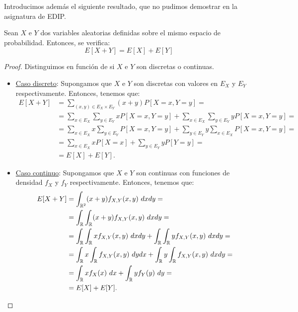 Introducimos además el siguiente resultado, que no pudimos demostrar en la asignatura de EDIP.
\begin{prop}
    Sean $X$ e $Y$ dos variables aleatorias definidas sobre el mismo espacio de probabilidad. Entonces, se verifica:
    \begin{equation*}
        E[X+Y] = E[X]+E[Y]
    \end{equation*}
\end{prop}
\begin{proof}
    Distinguimos en función de si $X$ e $Y$ son discretas o continuas.
    \begin{itemize}
        \item \ul{Caso discreto}: Supongamos que $X$ e $Y$ son discretas con valores en $E_X$ y $E_Y$ respectivamente. Entonces, tenemos que:
        \begin{align*}
            E[X+Y] &= \sum_{(x,y)\in E_X\times E_Y} (x+y)P[X=x,Y=y]
            =\\&= \sum_{x\in E_X}\sum_{y\in E_Y} xP[X=x,Y=y] + \sum_{x\in E_X}\sum_{y\in E_Y} yP[X=x,Y=y]
            =\\&= \sum_{x\in E_X} x\sum_{y\in E_Y} P[X=x,Y=y] + \sum_{y\in E_Y} y\sum_{x\in E_X} P[X=x,Y=y]
            =\\&= \sum_{x\in E_X} xP[X=x] + \sum_{y\in E_Y} yP[Y=y]
            =\\&= E[X]+E[Y].
        \end{align*}

        \item \ul{Caso continuo}: Supongamos que $X$ e $Y$ son continuas con funciones de densidad $f_X$ y $f_Y$ respectivamente. Entonces, tenemos que:
        \begin{align*}
            E[X+Y] &= \int_{\mathbb{R}^2} (x+y)f_{X,Y}(x,y)~d x d y
            =\\&= \int_{\mathbb{R}}\int_{\mathbb{R}} (x+y)f_{X,Y}(x,y)~d x d y
            =\\&= \int_{\mathbb{R}}\int_{\mathbb{R}} x f_{X,Y}(x,y)~d x d y + \int_{\mathbb{R}}\int_{\mathbb{R}} y f_{X,Y}(x,y)~d x d y
            =\\&= \int_{\mathbb{R}} x\int_{\mathbb{R}} f_{X,Y}(x,y)~d y d x + \int_{\mathbb{R}} y\int_{\mathbb{R}} f_{X,Y}(x,y)~d x d y
            =\\&= \int_{\mathbb{R}} x f_X(x)~d x + \int_{\mathbb{R}} y f_Y(y)~d y
            =\\&= E[X]+E[Y].
        \end{align*}
    \end{itemize}
\end{proof}

